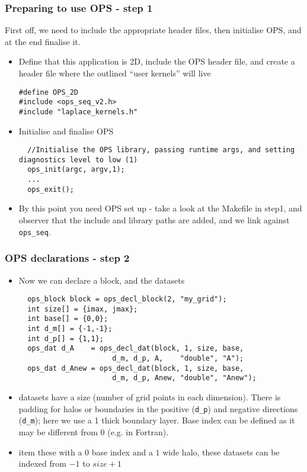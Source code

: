 \documentclass{beamer}
\begin{document}
\begin{frame}[fragile]
\frametitle{Preparing to use OPS - step 1}
First off, we need to include the appropriate header files, then initialise OPS, and at the end finalise it.
\begin{itemize}
\item Define that this application is 2D, include the OPS header file, and create a header file where the outlined ``user kernels'' will live
\begin{lstlisting}
#define OPS_2D
#include <ops_seq_v2.h>
#include "laplace_kernels.h"
\end{lstlisting}
\item Initialise and finalise OPS
\begin{lstlisting}
  //Initialise the OPS library, passing runtime args, and setting diagnostics level to low (1)
  ops_init(argc, argv,1);
  ...
  ops_exit();
\end{lstlisting}
\item By this point you need OPS set up - take a look at the Makefile in step1, and observer that the include and library paths are added, and we link against \texttt{ops\_seq}.
\end{itemize}
\end{frame}


\begin{frame}[fragile]
\frametitle{OPS declarations - step 2}
\begin{itemize}
\item Now we can declare a block, and the datasets
\begin{lstlisting}
  ops_block block = ops_decl_block(2, "my_grid");
  int size[] = {imax, jmax};
  int base[] = {0,0};
  int d_m[] = {-1,-1};
  int d_p[] = {1,1};
  ops_dat d_A    = ops_decl_dat(block, 1, size, base,
                      d_m, d_p, A,    "double", "A");
  ops_dat d_Anew = ops_decl_dat(block, 1, size, base,
                      d_m, d_p, Anew, "double", "Anew");
  \end{lstlisting}
  \item datasets have a size (number of grid points in each dimension). There is padding for halos or boundaries in the positive (\texttt{d\_p}) and negative directions (\texttt{d\_m}); here we use a 1 thick boundary layer. Base index can be defined as it may be different from 0 (e.g. in Fortran). 
  \item item these with a $0$ base index and a $1$ wide halo, these datasets can be indexed from $-1$ to $size+1$
\end{itemize}
\end{frame}
\end{document}
